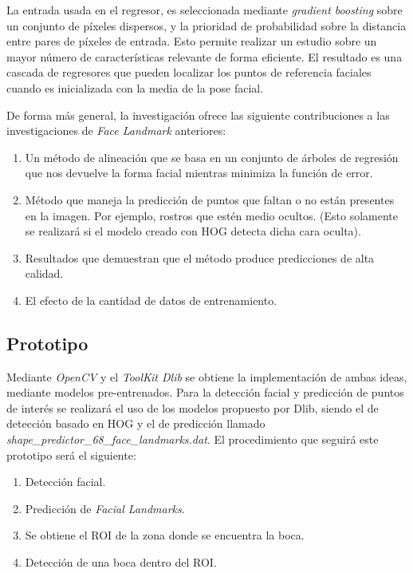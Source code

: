 La entrada usada en el regresor, es seleccionada mediante \textit{gradient boosting} sobre un conjunto de píxeles dispersos, y la prioridad de probabilidad sobre la distancia entre pares de píxeles de entrada. Esto permite realizar un estudio sobre un mayor número de características relevante de forma eficiente. El resultado es una cascada de regresores que pueden localizar los puntos de referencia faciales cuando es inicializada con la media de la pose facial.

De forma más general, la investigación ofrece las siguiente contribuciones a las investigaciones de \textit{Face Landmark} anteriores:

\begin{enumerate}
	\item Un método de alineación que se basa en un conjunto de árboles de regresión que nos devuelve la forma facial mientras minimiza la función de error.
	\item Método que maneja la predicción de puntos que faltan o no están presentes en la imagen. Por ejemplo, rostros que estén medio ocultos. (Esto solamente se realizará si el modelo creado con HOG detecta dicha cara oculta).
	\item Resultados que demuestran que el método produce predicciones de alta calidad.
	\item El efecto de la cantidad de datos de entrenamiento.
\end{enumerate}

\subsection*{Prototipo}

Mediante \textit{OpenCV} y el \textit{ToolKit Dlib} se obtiene la implementación de ambas ideas, mediante modelos pre-entrenados. Para la detección facial y predicción de puntos de interés se realizará el uso de los modelos propuesto por Dlib, siendo el de detección basado en HOG y el de predicción llamado \textit{shape\_predictor\_68\_face\_landmarks.dat}. El procedimiento que seguirá este prototipo será el siguiente:

\begin{enumerate}
	\item Detección facial.
	\item Predicción de \textit{Facial Landmarks}.
	\item Se obtiene el ROI de la zona donde se encuentra la boca.
	\item Detección de una boca dentro del ROI.
\end{enumerate}

